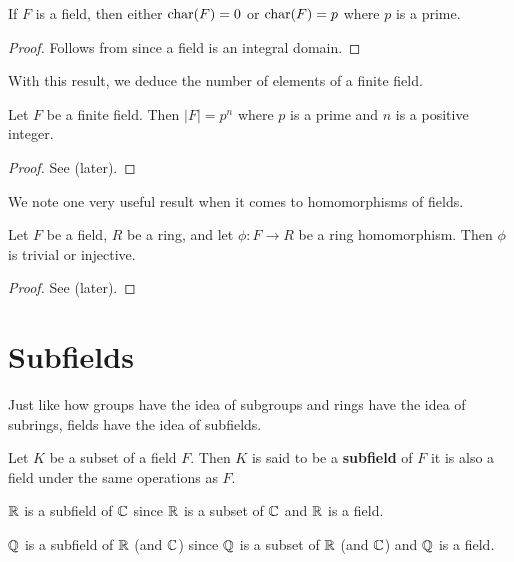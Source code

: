 \begin{proposition}
    If $F$ is a field, then either $\mathrm{char}(F) = 0$ or $\mathrm{char}(F) = p$ where $p$ is a prime.
\end{proposition}
\begin{proof}
    Follows from  since a field is an integral domain.
\end{proof}

With this result, we deduce the number of elements of a finite field.
\begin{theorem}\label{thrm-finite-field-has-prime-power-order}
    Let $F$ be a finite field. Then $|F| = p^n$ where $p$ is a prime and $n$ is a positive integer.
\end{theorem}
\begin{proof}
    See  (later).
\end{proof}

We note one very useful result when it comes to homomorphisms of fields.
\begin{theorem}\label{thrm-homomorphism-from-field-is-injective-or-trivial}
    Let $F$ be a field, $R$ be a ring, and let $\phi: F \to R$ be a ring homomorphism. Then $\phi$ is trivial or injective.
\end{theorem}
\begin{proof}
    See  (later).
\end{proof}

\section{Subfields}
Just like how groups have the idea of subgroups and rings have the idea of subrings, fields have the idea of subfields.
\begin{definition}
    Let $K$ be a subset of a field $F$. Then $K$ is said to be a \textbf{subfield} of $F$ it is also a field under the same operations as $F$.
\end{definition}

\begin{example}
    $\mathbb{R}$ is a subfield of $\mathbb{C}$ since $\mathbb{R}$ is a subset of $\mathbb{C}$ and $\mathbb{R}$ is a field.
\end{example}
\begin{example}
    $\mathbb{Q}$ is a subfield of $\mathbb{R}$ (and $\mathbb{C}$) since $\mathbb{Q}$ is a subset of $\mathbb{R}$ (and $\mathbb{C}$) and $\mathbb{Q}$ is a field.
\end{example}

